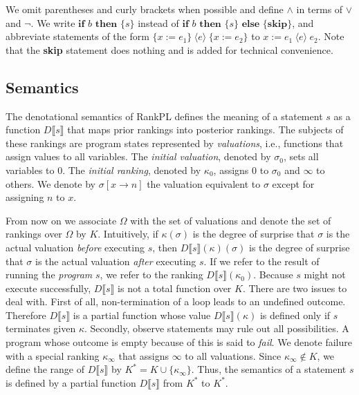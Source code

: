 \documentclass{llncs}
\newcommand{\dn}[1]{D\llbracket #1 \rrbracket}
\newcommand{\Rank}[1]{\hspace{3pt} \pmb{\langle} #1 \pmb{\rangle}\hspace{3pt} } %
\newcommand{\States}{\Omega}
\begin{document}
We omit parentheses and curly brackets when possible and define $\wedge$ in terms of $\vee$ and $\neg$.
We write $\textbf{if }b\textbf{ then } \{ s \}$ instead of $\textbf{if }b\textbf{ then } \{ s \}$ $\textbf{else }\{\textbf{skip}\}$,
	and abbreviate statements of the form $\{x := e_1\} \Rank{e} \{x := e_2\}$ to $x := e_1 \Rank{e} e_2$.
Note that the \textbf{skip} statement does nothing and is added for technical convenience.

\subsection{Semantics}
\label{sec:formalsemantics}

The denotational semantics of RankPL defines the meaning of a statement $s$ as a function $\dn{s}$ that maps prior rankings into posterior rankings.
The subjects of these rankings are program states represented by \emph{valuations}, i.e., functions that assign values to all variables.
The \emph{initial valuation}, denoted by $\sigma_0$, sets all variables to 0.
The \emph{initial ranking}, denoted by $\kappa_0$, assigns 0 to $\sigma_0$ and $\infty$ to others.
We denote by $\sigma[x \rightarrow n]$ the valuation equivalent to $\sigma$ except for assigning $n$ to $x$.

From now on we associate $\States$ with the set of valuations and denote the set of rankings over $\States$ by $K$.
Intuitively, if $\kappa(\sigma)$ is the degree of surprise 
	that $\sigma$ is the actual valuation \emph{before} executing $s$,
	then $\dn{s}(\kappa)(\sigma)$ is the degree of surprise 
	that $\sigma$ is the actual valuation \emph{after} executing $s$.
If we refer to the result of running the \emph{program} $s$, we refer to the ranking $\dn{s}(\kappa_0)$.
Because $s$ might not execute successfully, $\dn{s}$ is not a total function over $K$.
There are two issues to deal with.
First of all, non-termination of a loop leads to an undefined outcome.
Therefore $\dn{s}$ is a partial function whose value $\dn{s}(\kappa)$ is defined only if $s$ terminates given $\kappa$.
Secondly, observe statements may rule out all possibilities.
A program whose outcome is empty because of this is said to \emph{fail}.
We denote failure with a special ranking $\kappa_{\infty}$ that assigns $\infty$ to all valuations.
Since $\kappa_{\infty} \not \in K$, we define the range of $\dn{s}$ by $K^{*} = K \cup \{\kappa_{\infty}\}$.
Thus, the semantics of a statement $s$ is defined by a partial function $\dn{s}$ from $K^{*}$ to $K^{*}$.
\end{document}
